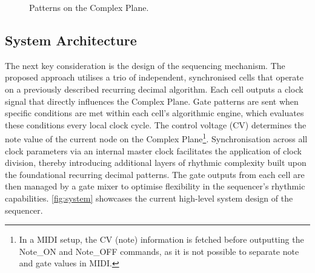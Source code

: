 \documentclass[12pt]{article}
\numberwithin{subsubsubsection}{subsubsection}
\begin{document}
\begin{figure}[H]
    \centering
    \caption{Patterns on the Complex Plane.}
    \label{fig:complex}
\end{figure}

\subsection{System Architecture}

The next key consideration is the design of the sequencing mechanism. The proposed approach utilises a trio of independent, synchronised cells that operate on a previously described recurring decimal algorithm. Each cell outputs a clock signal that directly influences the Complex Plane. Gate patterns are sent when specific conditions are met within each cell's algorithmic engine, which evaluates these conditions every local clock cycle. The control voltage (CV) determines the note value of the current node on the Complex Plane\footnote {In a MIDI setup, the CV (note) information is fetched before outputting the Note\_ON and Note\_OFF commands, as it is not possible to separate note and gate values in MIDI.}. Synchronisation across all clock parameters via an internal master clock facilitates the application of clock division, thereby introducing additional layers of rhythmic complexity built upon the foundational recurring decimal patterns. The gate outputs from each cell are then managed by a gate mixer to optimise flexibility in the sequencer's rhythmic capabilities. \autoref{fig:system} showcases the current high-level system design of the sequencer.
\end{document}
